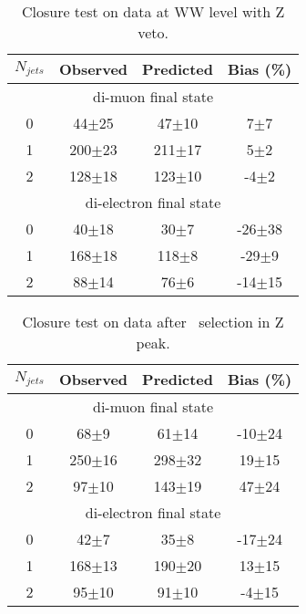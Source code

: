\begin{table}[!ht]
\begin{center}
\begin{tabular} {|c|ccc|}
\hline
$N_{jets}$  & Observed & Predicted & Bias (\%) \\
\hline 
\hline
\multicolumn{4}{|c|}{di-muon final state} \\
\hline
0 &  44$\pm$25 &  47$\pm$10 &  7$\pm$7 \\
1 & 200$\pm$23 & 211$\pm$17 &  5$\pm$2 \\
2 & 128$\pm$18 & 123$\pm$10 & -4$\pm$2 \\
\hline 
\hline
\multicolumn{4}{|c|}{di-electron final state} \\
\hline
0 &  40$\pm$18 &  30$\pm$7 & -26$\pm$38 \\
1 & 168$\pm$18 & 118$\pm$8 & -29$\pm$9  \\
2 &  88$\pm$14 &  76$\pm$6 & -14$\pm$15 \\
\hline 
\end{tabular}
\caption{Closure test on data at WW level with Z veto.}
\label{tab:data_closure_ww_zv}
\end{center}
\end{table}

\begin{table}[!ht]
\begin{center}
\begin{tabular} {|c|ccc|}
\hline
$N_{jets}$  & Observed & Predicted & Bias (\%) \\
\hline 
\hline
\multicolumn{4}{|c|}{di-muon final state} \\
\hline
0 &  68$\pm$9  &  61$\pm$14 & -10$\pm$24 \\
1 & 250$\pm$16 & 298$\pm$32 &  19$\pm$15 \\
2 &  97$\pm$10 & 143$\pm$19 &  47$\pm$24 \\
\hline 
\hline
\multicolumn{4}{|c|}{di-electron final state} \\
\hline
0 &  42$\pm$7  &  35$\pm$8  & -17$\pm$24 \\
1 & 168$\pm$13 & 190$\pm$20 &  13$\pm$15 \\
2 &  95$\pm$10 &  91$\pm$10 &  -4$\pm$15 \\
\hline 
\end{tabular}
\caption{Closure test on data after  \GeVcc\ selection in Z peak.}
\label{tab:data_closure_120_zp}
\end{center}
\end{table}


